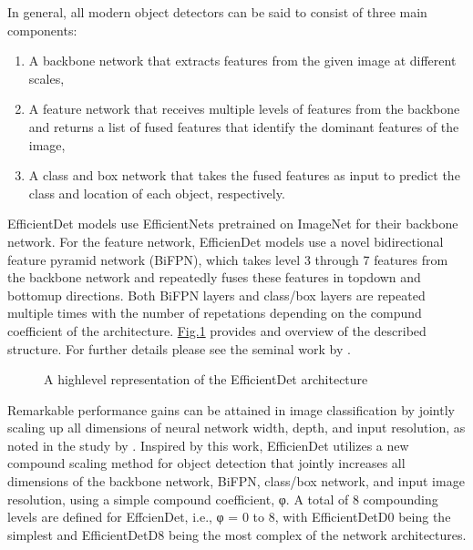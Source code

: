 \documentclass[letterpaper,10pt,english]{sphinxmanual}
\begin{document}
\sphinxAtStartPar
In general, all modern object detectors can be said to consist of three main components:
\begin{enumerate}
%
\item {} 
\sphinxAtStartPar
A backbone network that extracts features from the given image at different scales,

\item {} 
\sphinxAtStartPar
A feature network that receives multiple levels of features from the backbone and returns a list of fused features that identify the dominant features of the image,

\item {} 
\sphinxAtStartPar
A class and box network that takes the fused features as input to predict the class and location of each object, respectively.

\end{enumerate}

\sphinxAtStartPar
EfficientDet models use EfficientNets pretrained on ImageNet for their backbone network. For the feature network, EfficienDet models use a novel bidirectional feature pyramid network (BiFPN), which takes level 3 through 7 features from the backbone network and repeatedly fuses these features in top\sphinxhyphen{}down and bottom\sphinxhyphen{}up directions. Both BiFPN layers and class/box layers are repeated multiple times with the number of repetations depending on the compund coefficient of the architecture. \hyperref[\detokenize{common/technical_manual/nfloorTheory:fig-modelarch}]{Fig.\@ \ref{\detokenize{common/technical_manual/nfloorTheory:fig-modelarch}}}  provides and overview of the described structure. For further details please see the seminal work by .

\begin{figure}[htbp]
\centering
\capstart

\noindent{}
\caption{A high\sphinxhyphen{}level representation of the EfficientDet architecture}\label{\detokenize{common/technical_manual/nfloorTheory:id1}}\label{\detokenize{common/technical_manual/nfloorTheory:fig-modelarch}}\end{figure}

\sphinxAtStartPar
Remarkable performance gains can be attained in image classification by jointly scaling up all dimensions of neural network width, depth, and input resolution, as noted in the study by . Inspired by this work, EfficienDet utilizes a new compound scaling method for object detection that jointly increases all dimensions of the backbone network, BiFPN, class/box network, and input image resolution, using a simple compound coefficient, φ. A total of 8 compounding levels are defined for EffcienDet, i.e., φ = 0 to 8, with EfficientDet\sphinxhyphen{}D0 being the simplest and EfficientDet\sphinxhyphen{}D8 being the most complex of the network architectures.
\end{document}
